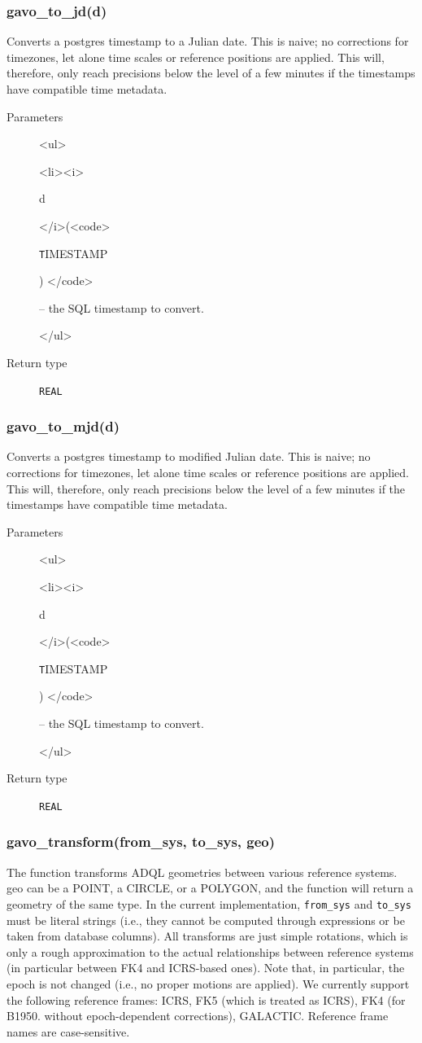 \documentclass[11pt,a4paper]{ivoa}
\newenvironment{args}%
{\begin{html}<ul>\end{html}\def\arg##1(##2){\begin{html}<li><i>\end{html}%
  ##1 \begin{html}</i>(<code>\end{html}##2\begin{html}) </code>\end{html}}}%
{\begin{html}</ul>\end{html}}
\begin{document}
\subsubsection{gavo\_to\_jd(d)}

Converts a postgres timestamp to a Julian date. This is naive;
no corrections for timezones, let alone time scales or reference
positions are applied.  This will, therefore, only reach precisions
below the level of a few minutes if the timestamps have compatible time
metadata.

\begin{description}
\item[Parameters]
\begin{args}
	\arg d (\texttt{TIMESTAMP}) -- the SQL timestamp to convert.
\end{args}

\item[Return type] \texttt{REAL}
\end{description}


\subsubsection{gavo\_to\_mjd(d)}

Converts a postgres timestamp to modified Julian date. This is naive;
no corrections for timezones, let alone time scales or reference
positions are applied.  This will, therefore, only reach precisions
below the level of a few minutes if the timestamps have compatible time
metadata.

\begin{description}
\item[Parameters]
\begin{args}
	\arg d (\texttt{TIMESTAMP}) -- the SQL timestamp to convert.
\end{args}

\item[Return type] \texttt{REAL}
\end{description}



\subsubsection{gavo\_transform(from\_sys, to\_sys, geo)}

The function transforms ADQL geometries between various reference
systems. geo can be a POINT, a CIRCLE, or a POLYGON, and the function
will return a geometry of the same type. In the current implementation,
\verb|from_sys| and \verb|to_sys| must be literal strings (i.e., they cannot be
computed through expressions or be taken from database columns). All
transforms are just simple rotations, which is only a rough
approximation to the actual relationships between reference systems (in
particular between FK4 and ICRS-based ones). Note that, in particular,
the epoch is not changed (i.e., no proper motions are applied). We
currently support the following reference frames: ICRS, FK5 (which is
treated as ICRS), FK4 (for B1950. without epoch-dependent corrections),
GALACTIC. Reference frame names are case-sensitive.
\end{document}
